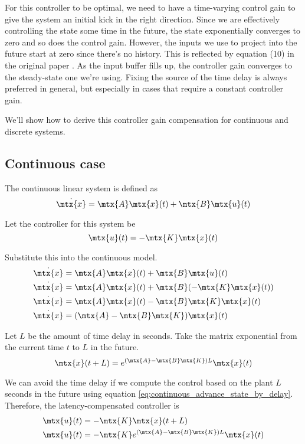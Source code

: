 For this controller to be optimal, we need to have a time-varying control gain
to give the system an initial kick in the right direction. Since we are
effectively controlling the state some time in the future, the state
exponentially converges to zero and so does the control gain. However, the
inputs we use to project into the future start at zero since there's no history.
This is reflected by equation (10) in the original paper
\cite{bib:lqr_time_delay}. As the input buffer fills up, the controller gain
converges to the steady-state one we're using. Fixing the source of the time
delay is always preferred in general, but especially in cases that require a
constant controller gain.

We'll show how to derive this controller gain compensation for continuous and
discrete systems.

\subsection{Continuous case}

The continuous linear system is defined as
\begin{equation*}
  \dot{\mtx{x}} = \mtx{A}\mtx{x}(t) + \mtx{B}\mtx{u}(t)
\end{equation*}

Let the controller for this system be
\begin{equation*}
  \mtx{u}(t) = -\mtx{K}\mtx{x}(t)
\end{equation*}

Substitute this into the continuous model.
\begin{align*}
  \dot{\mtx{x}} &= \mtx{A}\mtx{x}(t) + \mtx{B}\mtx{u}(t) \\
  \dot{\mtx{x}} &= \mtx{A}\mtx{x}(t) + \mtx{B}(-\mtx{K}\mtx{x}(t)) \\
  \dot{\mtx{x}} &= \mtx{A}\mtx{x}(t) - \mtx{B}\mtx{K}\mtx{x}(t) \\
  \dot{\mtx{x}} &= (\mtx{A} - \mtx{B}\mtx{K}) \mtx{x}(t)
\end{align*}

Let $L$ be the amount of time delay in seconds. Take the matrix exponential from
the current time $t$ to $L$ in the future.
\begin{equation}
  \mtx{x}(t + L) = e^{(\mtx{A} - \mtx{B}\mtx{K})L} \mtx{x}(t)
    \label{eq:continuous_advance_state_by_delay}
\end{equation}

We can avoid the time delay if we compute the control based on the plant $L$
seconds in the future using equation
\eqref{eq:continuous_advance_state_by_delay}. Therefore, the latency-compensated
controller is
\begin{align}
  \mtx{u}(t) &= -\mtx{K}\mtx{x}(t + L) \nonumber \\
  \mtx{u}(t) &= -\mtx{K} e^{(\mtx{A} - \mtx{B}\mtx{K})L} \mtx{x}(t)
\end{align}

